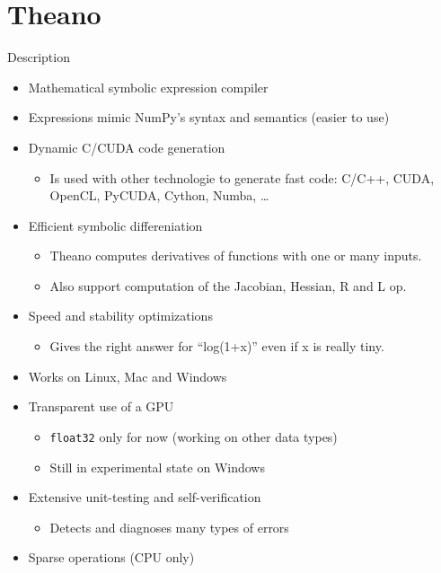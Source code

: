 \documentclass[utf8x,xcolor=pdftex,dvipsnames,table]{beamer}
\begin{document}
\section{Theano}
\begin{frame}{Description}
  \begin{itemize}
    \item Mathematical symbolic expression compiler
    \item Expressions mimic NumPy's syntax and semantics (easier to use)
    \item Dynamic C/CUDA code generation
    \begin{itemize}
      \item Is used with other technologie to generate fast code: C/C++, CUDA, OpenCL, PyCUDA, Cython, Numba, \ldots
    \end{itemize}
    \item Efficient symbolic differeniation
    \begin{itemize}
      \item Theano computes derivatives of functions with one or many inputs.
      \item Also support computation of the Jacobian, Hessian, R and L op.
    \end{itemize}
    \item Speed and stability optimizations
    \begin{itemize}
      \item Gives the right answer for ``log(1+x)'' even if x is really tiny.
    \end{itemize}
    \item Works on Linux, Mac and Windows
    \item Transparent use of a GPU
    \begin{itemize}
      \item {\tt float32} only for now (working on other data types)
      \item Still in experimental state on Windows
    \end{itemize}

    \item Extensive unit-testing and self-verification
    \begin{itemize}
      \item Detects and diagnoses many types of errors
    \end{itemize}

    \item Sparse operations (CPU only)
  \end{itemize}
\end{frame}
\end{document}
